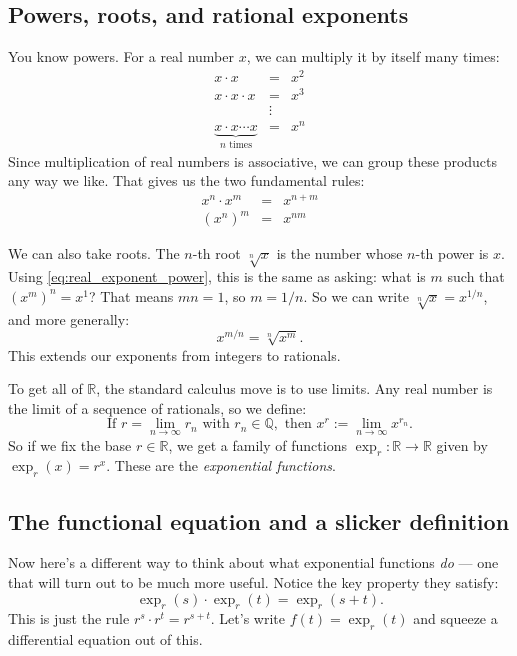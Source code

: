 \subsection{Powers, roots, and rational exponents}

You know powers. For a real number $x$, we can multiply it by itself many times:
\begin{eqnarray*}
    x \cdot x &=& x^2 \\
    x \cdot x \cdot x &=& x^3 \\
    & \vdots & \\
  \underbrace{x \cdot x \cdots x}_{n \text{ times}} &=& x^n
\end{eqnarray*}
Since multiplication of real numbers is associative, we can group these products any way we like. That gives us the two fundamental rules:
\begin{eqnarray}
    x^n \cdot x^m &=& x^{n+m} \label{eq:real_exponent_addition} \\
    (x^n)^m &=& x^{nm} \label{eq:real_exponent_power}
\end{eqnarray}

We can also take roots. The $n$-th root $\sqrt[n]{x}$ is the number whose $n$-th power is $x$. Using \eqref{eq:real_exponent_power}, this is the same as asking: what is $m$ such that $(x^m)^n = x^1$? That means $mn = 1$, so $m = 1/n$. So we can write $\sqrt[n]{x} = x^{1/n}$, and more generally:
\begin{equation}
    x^{m/n} = \sqrt[n]{x^m}.
\end{equation}
This extends our exponents from integers to rationals.

To get all of $\mathbb{R}$, the standard calculus move is to use limits. Any real number is the limit of a sequence of rationals, so we define:
\begin{equation}
    \text{If } r = \lim_{n \to \infty} r_n \text{ with } r_n \in \mathbb{Q}, \text{ then } x^r := \lim_{n \to \infty} x^{r_n}. \label{eq:real_exp_limit}
\end{equation}
So if we fix the base $r \in \mathbb{R}$, we get a family of functions $\exp_r: \mathbb{R} \to \mathbb{R}$ given by $\exp_r(x) = r^x$. These are the \emph{exponential functions}.

\subsection{The functional equation and a slicker definition}

Now here's a different way to think about what exponential functions \emph{do} --- one that will turn out to be much more useful. Notice the key property they satisfy:
\begin{equation}
    \exp_r(s) \cdot \exp_r(t) = \exp_r(s + t). \label{eq:functional_equation}
\end{equation}
This is just the rule $r^s \cdot r^t = r^{s+t}$. Let's write $f(t) = \exp_r(t)$ and squeeze a differential equation out of this.

